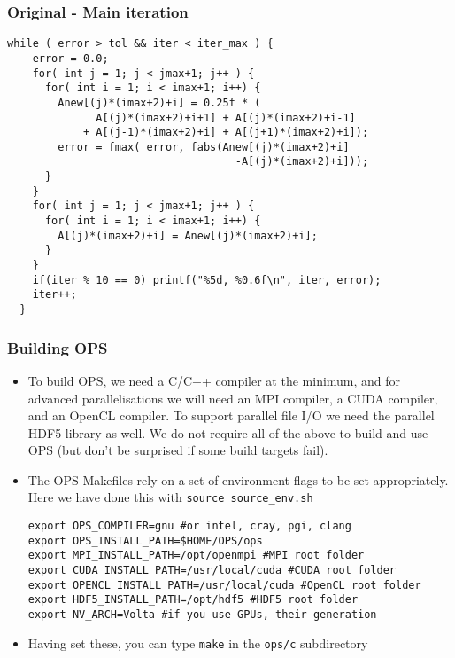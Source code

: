 \documentclass{beamer}
\begin{document}
\begin{frame}[fragile]
\frametitle{Original - Main iteration}

\begin{lstlisting}
while ( error > tol && iter < iter_max ) {
    error = 0.0;
    for( int j = 1; j < jmax+1; j++ ) {
      for( int i = 1; i < imax+1; i++) {
        Anew[(j)*(imax+2)+i] = 0.25f * (
              A[(j)*(imax+2)+i+1] + A[(j)*(imax+2)+i-1]
            + A[(j-1)*(imax+2)+i] + A[(j+1)*(imax+2)+i]);
        error = fmax( error, fabs(Anew[(j)*(imax+2)+i]
                                    -A[(j)*(imax+2)+i]));
      }
    }
    for( int j = 1; j < jmax+1; j++ ) {
      for( int i = 1; i < imax+1; i++) {
        A[(j)*(imax+2)+i] = Anew[(j)*(imax+2)+i];
      }
    }
    if(iter % 10 == 0) printf("%5d, %0.6f\n", iter, error);
    iter++;
  }
    \end{lstlisting}
\end{frame}

\begin{frame}[fragile]
\frametitle{Building OPS}
\fontsize{11}{12}\selectfont
\begin{itemize}
\item To build OPS, we need a C/C++ compiler at the minimum, and for advanced parallelisations we will need an MPI compiler, a CUDA compiler, and an OpenCL compiler. To support parallel file I/O we need the parallel HDF5 library as well. We do not require all of the above to build and use OPS (but don't be surprised if some build targets fail).
\item The OPS Makefiles rely on a set of environment flags to be set appropriately. Here we have done this with \texttt{source source\_env.sh}
\begin{lstlisting}[basicstyle=\tiny]
export OPS_COMPILER=gnu #or intel, cray, pgi, clang
export OPS_INSTALL_PATH=$HOME/OPS/ops
export MPI_INSTALL_PATH=/opt/openmpi #MPI root folder
export CUDA_INSTALL_PATH=/usr/local/cuda #CUDA root folder
export OPENCL_INSTALL_PATH=/usr/local/cuda #OpenCL root folder
export HDF5_INSTALL_PATH=/opt/hdf5 #HDF5 root folder
export NV_ARCH=Volta #if you use GPUs, their generation
\end{lstlisting}
\item Having set these, you can type \texttt{make} in the \texttt{ops/c} subdirectory
\end{itemize}
\end{frame}
\end{document}
